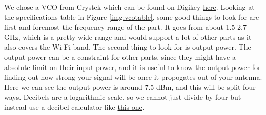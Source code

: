 We chose a VCO from Crystek which can be found on Digikey \href{https://www.digikey.com/en/products/detail/crystek-corporation/CVCO55BE-1530-2700/1644030}{here}.
Looking at the specifications table in Figure \ref{img:vcotable}, some good things to look for are first and foremost the frequency
range of the part. It goes from about 1.5-2.7 GHz, which is a pretty wide range and would support a lot of other parts as it also
covers the Wi-Fi band. The second thing to look for is output power. The output power can be a constraint for other parts, since they
might have a absolute limit on their input power, and it is useful to know the output power for finding out how strong your signal will be
once it propogates out of your antenna. Here we can see the output power is around 7.5 dBm, and this will be split four ways. 
Decibels are a logarithmic scale, so we cannot just divide by four but instead use a decibel calculator like \href{https://noisetools.net/decibelcalculator}{this one}.


